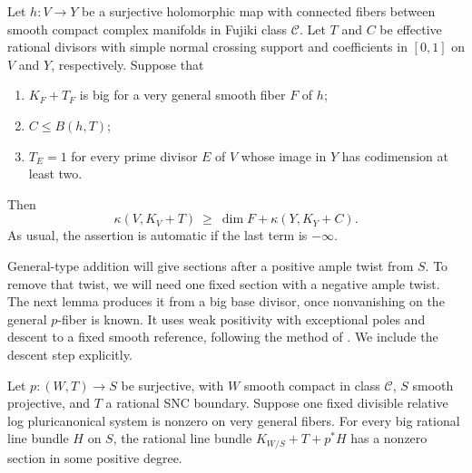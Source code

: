 \begin{proposition}\label{generaltype:addition}
Let \(h\colon V\to Y\) be a surjective holomorphic map with connected fibers
between smooth compact complex manifolds in Fujiki class \(\mathcal C\).
Let \(T\) and \(C\) be effective rational divisors with simple normal crossing
support and coefficients in \([0,1]\) on \(V\) and \(Y\), respectively.
Suppose that
\begin{enumerate}[label=\textup{(\roman*)}]
\item \(K_F+T_F\) is big for a very general smooth fiber \(F\) of \(h\);
\item \(C\leq B(h,T)\);
\item \(T_E=1\) for every prime divisor \(E\) of \(V\) whose image in \(Y\)
has codimension at least two.
\end{enumerate}
Then
\begin{equation}\label{generaltype:inequality}
  \kappa(V,K_V+T)\ \geq\
  \dim F+\kappa(Y,K_Y+C).
\end{equation}
As usual, the assertion is automatic if the last term is \(-\infty\).
\end{proposition}


General-type addition will give sections after a positive ample
twist from $S$. To remove that twist, we will need one fixed section
with a negative ample twist. The next lemma produces it from a big
base divisor, once nonvanishing on the general $p$-fiber is known.
It uses weak positivity with exceptional poles and
descent to a fixed smooth reference, following the method of
\cite[Remark~6.5(3) and Proposition~6.6]{CampanaOrbifolds}.
We include the descent step explicitly.

\begin{lemma}
\label{application:weak-effectivity}
Let $p:(W,T)\to S$ be surjective, with $W$ smooth compact in
class $\mathcal C$, $S$ smooth projective, and $T$ a rational SNC
boundary. Suppose one fixed divisible relative log pluricanonical
system is nonzero on very general fibers. For every big rational
line bundle $H$ on $S$, the rational line bundle
$K_{W/S}+T+p^*H$ has a nonzero section in some positive degree.
\end{lemma}

